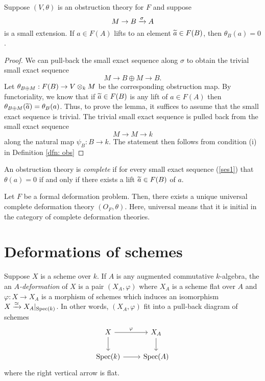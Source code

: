 \documentclass[11pt]{amsart}
\begin{document}
\begin{lem}
Suppose $(V, \theta)$ is an obstruction theory for $F$ and suppose 
\[
M \to B \xto{\sigma} A 
\]
is a small extension. 
If $a \in F(A)$ lifts to an element $\Tilde{a} \in F(B)$, then $\theta_B(a) = 0$. 
\end{lem}
\begin{proof}
We can pull-back the small exact sequence along $\sigma$ to obtain the trivial small exact sequence
\[
M \to B \oplus M \to B .
\] 
Let $\theta_{B \oplus M} : F(B) \to V \tensor_k M$ be the corresponding obstruction map. 
By functoriality, we know that if $\Tilde{a} \in F(B)$ is any lift of $a \in F(A)$ then $\theta_{B \oplus M} (\Tilde{a}) = \theta_B(a)$. 
Thus, to prove the lemma, it suffices to assume that the small exact sequence is trivial. 
The trivial small exact sequence is pulled back from the small exact sequence
\[
M \to M \to k
\]
along the natural map $\psi_B : B \to k$. 
The statement then follows from condition (i) in Definition \ref{dfn: obs}
\end{proof}

\begin{dfn}
An obstruction theory is {\em complete} if for every small exact sequence (\ref{ses1}) that $\theta(a) = 0$ if and only if there exists a lift $\Tilde{a} \in F(B)$ of $a$.
\end{dfn}

\begin{thm}
Let $F$ be a formal deformation problem. 
Then, there exists a unique universal complete deformation theory $(O_F, \theta)$.
Here, universal means that it is initial in the category of complete deformation theories. 
\end{thm}

\section{Deformations of schemes}

\begin{dfn}
Suppose $X$ is a scheme over $k$. 
If $A$ is any augmented commutative $k$-algebra, the an {\em $A$-deformation} of $X$ is a pair $(X_A, \varphi)$ where $X_A$ is a scheme flat over $A$ and $\varphi : X \to X_A$ is a morphism of schemes which induces an isomorphism $X \xto{\simeq} X_A |_{{\rm Spec}(k)}$. 
In other words, $(X_A, \varphi)$ fit into a pull-back diagram of schemes
\[
\begin{tikzcd}
X \ar[d] \ar[r, "\varphi"] & X_A \ar[d] \\ 
{\rm Spec}(k) \ar[r] &{\rm Spec}(A) 
\end{tikzcd} 
\]
where the right vertical arrow is flat.
\end{dfn}
\end{document}
